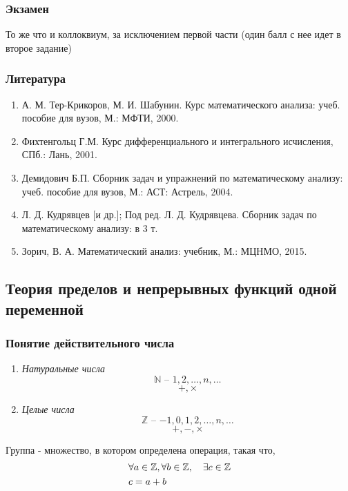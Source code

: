 \subsubsection{Экзамен}
То же что и коллоквиум, за исключением первой части (один балл с нее идет в второе задание)
\subsubsection{Литература}
\begin{enumerate}
	\item А. М. Тер-Крикоров, М. И. Шабунин. Курс математического анализа: учеб. пособие для вузов, М.:	МФТИ, 2000.
	
	\item Фихтенгольц Г.М. Курс дифференциального и интегрального исчисления, СПб.: Лань, 2001.
	
	\item Демидович Б.П. Сборник задач и упражнений по математическому анализу: учеб. пособие для вузов, М.: АСТ: Астрель, 2004.
	
	\item Л. Д. Кудрявцев [и др.]; Под ред. Л. Д. Кудрявцева. Сборник задач по математическому анализу: в 3 т.
	
	\item Зорич, В. А. Математический анализ: учебник, М.: МЦНМО, 2015.
\end{enumerate}

\subsection{Теория пределов и непрерывных функций одной переменной}

\subsubsection{Понятие действительного числа}
\begin{enumerate}[label=(\alph*), series=numbers]
	\item \emph{Натуральные числа}
	\[ \mathbb{N} \text{ -- } 1, 2, \dots, n, \dots \]
	\[ +, \times \]
	
	\item \emph{Целые числа}
	\[ \mathbb{Z} \text{ -- } {-1}, 0, 1, 2, \dots, n, \dots \]
	\[ +, -, \times \]
\end{enumerate}	

Группа - множество, в котором определена операция, такая что,
\begin{align*}
	&\forall a \in \mathbb{Z}, \forall b \in \mathbb{Z}, \quad \exists c \in \mathbb{Z} \\
	&c = a + b
\end{align*}

